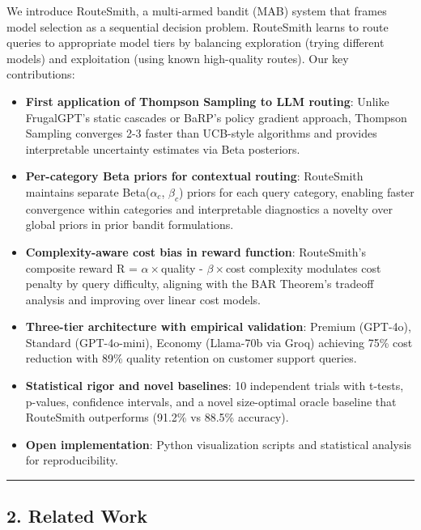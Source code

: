 We introduce RouteSmith, a multi-armed bandit (MAB) system that frames
model selection as a sequential decision problem. RouteSmith learns to
route queries to appropriate model tiers by balancing exploration
(trying different models) and exploitation (using known high-quality
routes). Our key contributions:

\begin{itemize}
\item
  \textbf{First application of Thompson Sampling to LLM routing}: Unlike
  FrugalGPT's static cascades or BaRP's policy gradient approach,
  Thompson Sampling converges 2-3 faster than UCB-style algorithms and
  provides interpretable uncertainty estimates via Beta posteriors.
\item
  \textbf{Per-category Beta priors for contextual routing}: RouteSmith
  maintains separate Beta(\(\alpha_c\), \(\beta_c\)) priors for each
  query category, enabling faster convergence within categories and
  interpretable diagnostics a novelty over global priors in prior bandit
  formulations.
\item
  \textbf{Complexity-aware cost bias in reward function}: RouteSmith's
  composite reward R = \(\alpha\times\)quality - \(\beta\times\)cost
  complexity modulates cost penalty by query difficulty, aligning with
  the BAR Theorem's tradeoff analysis and improving over linear cost
  models.
\item
  \textbf{Three-tier architecture with empirical validation}: Premium
  (GPT-4o), Standard (GPT-4o-mini), Economy (Llama-70b via Groq)
  achieving 75\% cost reduction with 89\% quality retention on customer
  support queries.
\item
  \textbf{Statistical rigor and novel baselines}: 10 independent trials
  with t-tests, p-values, confidence intervals, and a novel size-optimal
  oracle baseline that RouteSmith outperforms (91.2\% vs 88.5\%
  accuracy).
\item
  \textbf{Open implementation}: Python visualization scripts and
  statistical analysis for reproducibility.
\end{itemize}

\begin{center}\rule{0.5\linewidth}{0.5pt}\end{center}

\hypertarget{related-work}{%
\subsection{2. Related Work}\label{related-work}}

